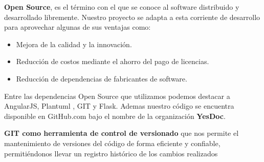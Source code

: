 \documentclass[a4paper,twocolumn,12pt]{article}
\begin{document}
\textbf{Open Source}, es el término con el que se conoce al software distribuido y desarrollado libremente. Nuestro proyecto se adapta a esta corriente de desarrollo para aprovechar algunas de sus ventajas como: 

\begin{itemize}
\item Mejora de la calidad y la innovación.
\item Reducción de costos mediante el ahorro del pago de licencias.
\item Reducción de dependencias de fabricantes de software.
\end{itemize}

Entre las dependencias Open Source que utilizamos podemos destacar a AngularJS, Plantuml \cite{wiki:plantUML}, GIT y Flask. Ademas nuestro código se encuentra disponible en GitHub.com bajo el nombre de la organización \textbf{YesDoc}.


\textbf{GIT como herramienta de control de versionado} que nos permite el mantenimiento de versiones del código de forma eficiente y confiable, permitiéndonos llevar un registro histórico de los cambios realizados
\end{document}
